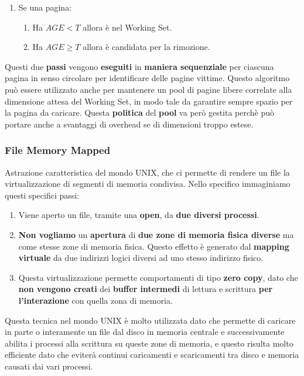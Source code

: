 \documentclass{article}
\begin{document}
\begin{enumerate}
\begin{enumerate}
\begin{enumerate}
\begin{enumerate}
            \end{enumerate}
            \item Se una pagina:
            \begin{enumerate}
                \item Ha $AGE < T$ allora è nel Working Set.
                \item Ha $AGE \geq T$ allora è candidata per la rimozione.
            \end{enumerate}
        \end{enumerate}
        Questi due \textbf{passi} vengono \textbf{eseguiti} in \textbf{maniera sequenziale} per ciascuna pagina in senso circolare per identificare delle pagine vittime. Questo algoritmo può essere utilizzato anche per mantenere un pool di pagine libere correlate alla dimensione attesa del Working Set, in modo tale da garantire sempre spazio per la pagina da caricare. Questa \textbf{politica} del \textbf{pool} va però gestita perchè può portare anche a svantaggi di overhead se di dimensioni troppo estese.
    \end{enumerate}
\end{enumerate}

\subsubsection{File Memory Mapped}

Astrazione caratteristica del mondo UNIX, che ci permette di rendere un file la virtualizzazione di segmenti di memoria condivisa. Nello specifico immaginiamo questi specifici passi:

\begin{enumerate}
    \item Viene aperto un file, tramite una \textbf{open}, da \textbf{due diversi processi}.
    \item \textbf{Non vogliamo} un \textbf{apertura} di \textbf{due zone di memoria fisica diverse} ma come stesse zone di memoria fisica. Questo effetto è generato dal \textbf{mapping virtuale} da due indirizzi logici diversi ad uno stesso indirizzo fisico.
    \item Questa virtualizzazione permette comportamenti di tipo \textbf{zero copy}, dato che \textbf{non vengono creati} dei \textbf{buffer intermedi} di lettura e scrittura \textbf{per l'interazione} con quella zona di memoria.
\end{enumerate}

Questa tecnica nel mondo UNIX è molto utilizzata dato che permette di caricare in parte o interamente un file dal disco in memoria centrale e successivamente abilita i processi alla scrittura su queste zone di memoria, e questo risulta molto efficiente dato che eviterà continui caricamenti e scaricamenti tra disco e memoria causati dai vari processi. 
\end{document}
